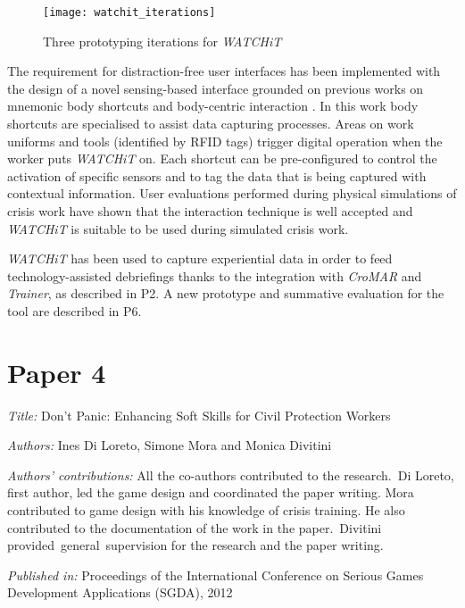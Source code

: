 \begin{figure}
	[tbh] \centering 
	\texttt{[image: watchit\_iterations]} \caption{Three prototyping iterations for \emph{WATCHiT}} \label{fig:watchit-prototypes} 
\end{figure}

The requirement for distraction-free user interfaces has been implemented with the design of a novel sensing-based interface grounded on previous works on mnemonic body shortcuts and body-centric interaction \autocites{Guerreiro:2008wt}{Chen:2012wk}. In this work body shortcuts are specialised to assist data capturing processes. Areas on work uniforms and tools (identified by RFID tags) trigger digital operation when the worker puts \emph{WATCHiT} on. Each shortcut can be pre-configured to control the activation of specific sensors and to tag the data that is being captured with contextual information. User evaluations performed during physical simulations of crisis work have shown that the interaction technique is well accepted and \emph{WATCHiT} is suitable to be used during simulated crisis work.

\emph{WATCHiT} has been used to capture experiential data in order to feed technology-assisted debriefings thanks to the integration with \emph{CroMAR} and \emph{Trainer}, as described in P2. A new prototype and summative evaluation for the tool are described in P6.


\section[P4: Don't Panic: Enhancing Soft Skills for Civil Protection Workers][Paper 4]{Paper 4}\label{paper-4}

\emph{Title:} Don't Panic: Enhancing Soft Skills for Civil Protection Workers

\emph{Authors:} Ines Di Loreto, Simone Mora and Monica Divitini

\emph{Authors' contributions:} All the co-authors contributed to the research.~Di Loreto, first author, led the game design and coordinated the paper writing. Mora contributed to game design with his knowledge of crisis training. He also contributed to the documentation of the work in the paper.~Divitini provided~general~supervision for the research and the paper writing.

\emph{Published in:} Proceedings of the International Conference on Serious Games Development Applications (SGDA), 2012 

